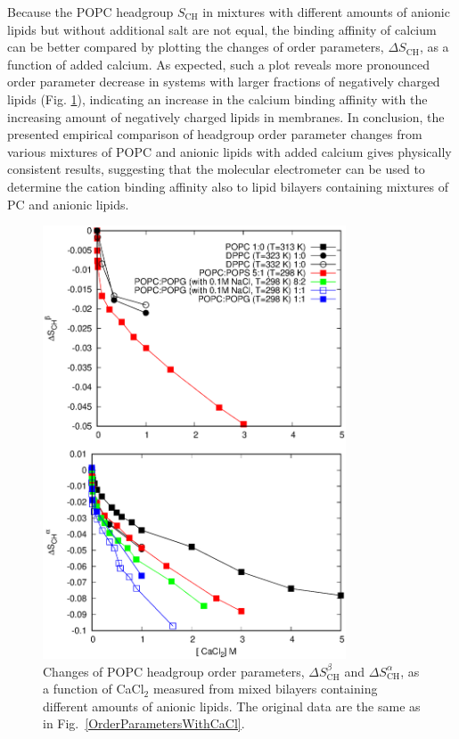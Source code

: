 \documentclass[journal=jpcbfk,manuscript=article]{achemso}
\begin{document}
Because the POPC headgroup $S_\mathrm{CH}$ in mixtures with different amounts of anionic lipids
but without additional salt are not equal, the binding affinity of calcium can be better compared
by plotting the changes of order parameters, $\Delta S_\mathrm{CH}$, as a function of added calcium.
As expected, such a plot reveals more pronounced order parameter decrease in systems
with larger fractions of negatively charged lipids (Fig. \ref{OrderParameterCHANGESWithCaClBELOW1M}),
indicating an increase in the calcium binding affinity with the increasing amount of negatively charged
lipids in membranes. In conclusion, the presented empirical comparison of headgroup order parameter changes
from various mixtures of POPC and anionic lipids with added calcium gives physically
consistent results, suggesting that the molecular electrometer can be used to determine
the cation binding affinity also to lipid bilayers containing mixtures of PC and anionic lipids.  
\begin{figure}[t]
  \centering
  \includegraphics[width=9.0cm]{../Figs/CHANGESwithCaCl.eps}
  \caption{\label{OrderParameterCHANGESWithCaClBELOW1M}
    Changes of POPC headgroup order parameters, $\Delta S^\beta_\mathrm{CH}$ and $\Delta S^\alpha_\mathrm{CH}$, as a function of CaCl$_2$
    measured from mixed bilayers containing different amounts of anionic lipids.
    The original data are the same as in Fig.~\ref{OrderParametersWithCaCl}.
  }
\end{figure}
\end{document}
